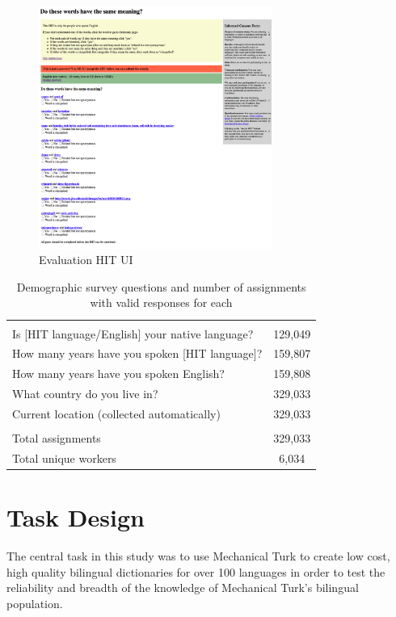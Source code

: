 \documentclass[11pt]{article}
\begin{document}
\begin{figure}[h]
\centering
\includegraphics[width=3in]{figures/synonyms_hit_mturk}
\caption{Evaluation HIT UI}
\label{synhit}
\end{figure}

\begin{table}[h]
\centering
\begin{tabular}{lc}\hline\hline\\
Is [HIT language/English] your native language? &129,049\\
How many years have you spoken [HIT language]?&159,807\\
How many years have you spoken English?&159,808\\
What country do you live in?&329,033\\
Current location (collected automatically)& 329,033\\
\hline\\
Total assignments& 329,033\\
Total unique workers& 6,034\\
\hline\hline
\end{tabular}
\caption{Demographic survey questions and number of assignments with valid responses for each}
\label{survey-tab}
\end{table}

\section{Task Design}
The central task in this study was to use Mechanical Turk to create low cost, high quality bilingual dictionaries for over 100 languages in order to test the reliability and breadth of the knowledge of Mechanical Turk's bilingual population. 
\end{document}
